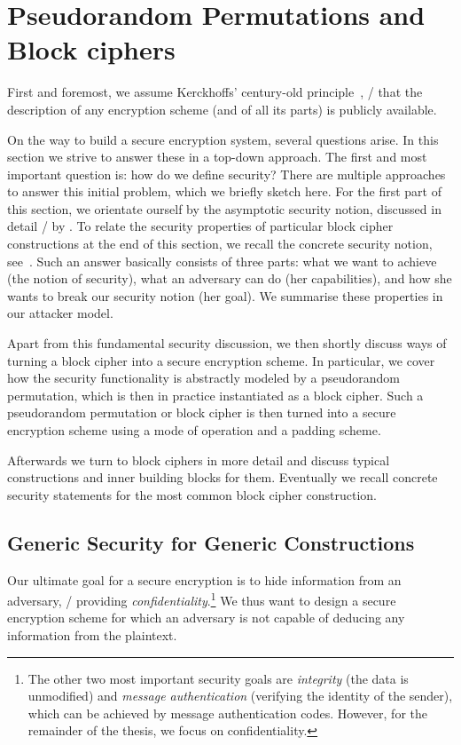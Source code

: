 \section{Pseudorandom Permutations and Block ciphers}\label{sec:prelim:bc}

First and foremost, we assume Kerckhoffs' century-old principle~\cite[p.~12, 2nd condition]{kerckhoffs83}, \ie/ that the description of any encryption scheme (and of all its parts) is publicly available.

On the way to build a secure encryption system, several questions arise.
In this section we strive to answer these in a top-down approach.
The first and most important question is: how do we define security?
There are multiple approaches to answer this initial problem, which we briefly sketch here.
For the first part of this section, we orientate ourself by the asymptotic security notion, discussed in detail \eg/ by \textcite{katzlindell}.
To relate the security properties of particular block cipher constructions at the end of this section, we recall the concrete security notion, see~\cite{FOCS:BDJR97}.
Such an answer basically consists of three parts: what we want to achieve (the notion of security), what an adversary can do (her capabilities), and how she wants to break our security notion (her goal).
We summarise these properties in our attacker model.

Apart from this fundamental security discussion, we then shortly discuss ways of turning a block cipher into a secure encryption scheme.
In particular, we cover how the security functionality is abstractly modeled by a pseudorandom permutation, which is then in practice instantiated as a block cipher.
Such a pseudorandom permutation or block cipher is then turned into a secure encryption scheme using a mode of operation and a padding scheme.

Afterwards we turn to block ciphers in more detail and discuss typical constructions and inner building blocks for them.
Eventually we recall concrete security statements for the most common block cipher construction.

\subsection{Generic Security for Generic Constructions}
Our ultimate goal for a secure encryption is to hide information from an adversary, \ie/ providing \emph{confidentiality}.\footnote{%
    The other two most important security goals are \emph{integrity} (the data is unmodified) and \emph{message authentication} (verifying the identity of the sender), which can be achieved by message authentication codes.
    However, for the remainder of the thesis, we focus on confidentiality.
}
We thus want to design a secure encryption scheme for which an adversary is not capable of deducing any information from the plaintext.

